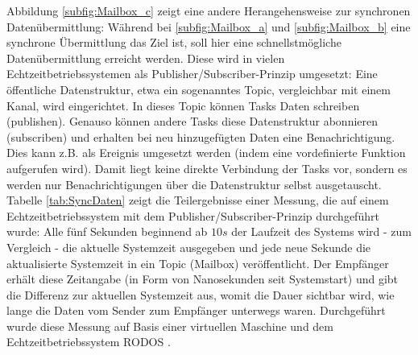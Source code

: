 \documentclass{llncs}
\begin{document}
Abbildung \ref{subfig:Mailbox_c} zeigt eine andere Herangehensweise zur synchronen Datenübermittlung: Während bei \ref{subfig:Mailbox_a} und \ref{subfig:Mailbox_b} eine synchrone Übermittlung das Ziel ist, soll hier eine schnellstmögliche Datenübermittlung erreicht werden. Diese wird in vielen Echtzeitbetriebssystemen als Publisher/Subscriber-Prinzip umgesetzt: Eine öffentliche Datenstruktur, etwa ein sogenanntes Topic, vergleichbar mit einem Kanal, wird eingerichtet. In dieses Topic können Tasks Daten schreiben (publishen). Genauso können andere Tasks diese Datenstruktur abonnieren (subscriben) und erhalten bei neu hinzugefügten Daten eine Benachrichtigung. Dies kann z.B. als Ereignis umgesetzt werden (indem eine vordefinierte Funktion aufgerufen wird). Damit liegt keine direkte Verbindung der Tasks vor, sondern es werden nur Benachrichtigungen über die Datenstruktur selbst ausgetauscht.\\

Tabelle \ref{tab:SyncDaten} zeigt die Teilergebnisse einer Messung, die auf einem Echtzeitbetriebssystem mit dem Publisher/Subscriber-Prinzip durchgeführt wurde: Alle fünf Sekunden beginnend ab $10 s$ der Laufzeit des Systems wird - zum Vergleich - die aktuelle Systemzeit ausgegeben und jede neue Sekunde die aktualisierte Systemzeit in ein Topic (Mailbox) veröffentlicht. Der Empfänger erhält diese Zeitangabe (in Form von Nanosekunden seit Systemstart) und gibt die Differenz zur aktuellen Systemzeit aus, womit die Dauer sichtbar wird, wie lange die Daten vom Sender zum Empfänger unterwegs waren. Durchgeführt wurde diese Messung auf Basis einer virtuellen Maschine und dem Echtzeitbetriebssystem RODOS \autocite{Wuerzburg2019}.
\end{document}
